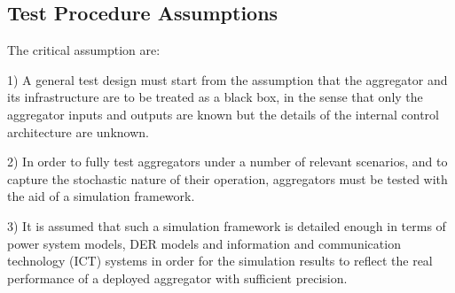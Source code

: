 
\subsection{Test Procedure Assumptions}\label{subsec:assumptions}
The critical assumption are:

1) A general test design must start from the assumption that the aggregator and its infrastructure are to be treated as a black box, in the sense that only the aggregator inputs and outputs are known but the details of the internal control architecture are unknown.

2) In order to fully test aggregators under a number of relevant scenarios, and to capture the stochastic nature of their operation, aggregators must be tested with the aid of a simulation framework. %

3) It is assumed that such a simulation framework is detailed enough in terms of power system models, DER models and information and communication technology (ICT) systems in order for the simulation results to reflect the real performance of a deployed aggregator with sufficient precision.

